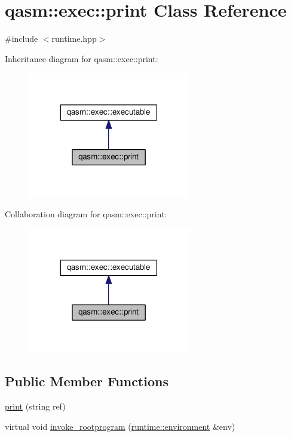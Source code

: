 \hypertarget{classqasm_1_1exec_1_1print}{}\section{qasm\+:\+:exec\+:\+:print Class Reference}
\label{classqasm_1_1exec_1_1print}


{\ttfamily \#include $<$runtime.\+hpp$>$}



Inheritance diagram for qasm\+:\+:exec\+:\+:print\+:\nopagebreak
\begin{figure}[H]
\begin{center}
\leavevmode
\includegraphics[width=201pt]{classqasm_1_1exec_1_1print__inherit__graph}
\end{center}
\end{figure}


Collaboration diagram for qasm\+:\+:exec\+:\+:print\+:\nopagebreak
\begin{figure}[H]
\begin{center}
\leavevmode
\includegraphics[width=201pt]{classqasm_1_1exec_1_1print__coll__graph}
\end{center}
\end{figure}
\subsection*{Public Member Functions}
\begin{DoxyCompactItemize}
\item 
\hyperlink{classqasm_1_1exec_1_1print_ac6a07cc31446b99250263e748ac0c60d}{print} (string ref)
\item 
virtual void \hyperlink{classqasm_1_1exec_1_1print_ae803c9f70d2a1afd3bbe6e0520e9678b}{invoke\+\_\+rootprogram} (\hyperlink{classqasm_1_1runtime_1_1environment}{runtime\+::environment} \&env)
\end{DoxyCompactItemize}

